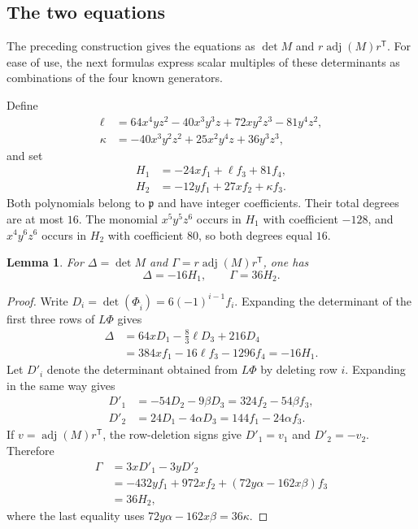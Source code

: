 \documentclass[11pt]{amsart}
\newtheorem{lemma}[theorem]{Lemma}
\theoremstyle{remark}
\DeclareMathOperator{\adj}{adj}
\begin{document}
\subsection{The two equations}

The preceding construction gives the equations as $\det M$ and $r\adj(M)r^{\mathsf T}$. For ease of use, the next formulas express scalar multiples of these determinants as combinations of the four known generators.

Define
\begin{align*}
 \ell&=64x^4yz^2-40x^3y^3z+72xy^2z^3-81y^4z^2,\\
 \kappa&=-40x^3y^2z^2+25x^2y^4z+36y^3z^3,
\end{align*}
and set
\begin{equation}\label{eq:H}
 \begin{aligned}
 H_1&=-24xf_1+\ell f_3+81f_4,\\
 H_2&=-12yf_1+27xf_2+\kappa f_3.
 \end{aligned}
\end{equation}
Both polynomials belong to $\mathfrak p$ and have integer coefficients. Their total degrees are at most $16$. The monomial $x^5y^5z^6$ occurs in $H_1$ with coefficient $-128$, and $x^4y^6z^6$ occurs in $H_2$ with coefficient $80$, so both degrees equal $16$.

\begin{lemma}\label{lem:det}
For $\Delta=\det M$ and $\Gamma=r\adj(M)r^{\mathsf T}$, one has
\[
 \Delta=-16H_1,\qquad \Gamma=36H_2.
\]
\end{lemma}

\begin{proof}
Write $D_i=\det(\Phi_{\widehat i})=6(-1)^{i-1}f_i$. Expanding the determinant of the first three rows of $L\Phi$ gives
\begin{align*}
 \Delta&=64xD_1-\frac83\ell D_3+216D_4\\
       &=384xf_1-16\ell f_3-1296f_4=-16H_1.
\end{align*}
Let $D'_i$ denote the determinant obtained from $L\Phi$ by deleting row $i$. Expanding in the same way gives
\begin{align*}
 D'_1&=-54D_2-9\beta D_3=324f_2-54\beta f_3,\\
 D'_2&=24D_1-4\alpha D_3=144f_1-24\alpha f_3.
\end{align*}
If $v=\adj(M)r^{\mathsf T}$, the row-deletion signs give $D'_1=v_1$ and $D'_2=-v_2$. Therefore
\begin{align*}
 \Gamma&=3xD'_1-3yD'_2\\
       &=-432yf_1+972xf_2+(72y\alpha-162x\beta)f_3\\
       &=36H_2,
\end{align*}
where the last equality uses $72y\alpha-162x\beta=36\kappa$.
\end{proof}
\end{document}
